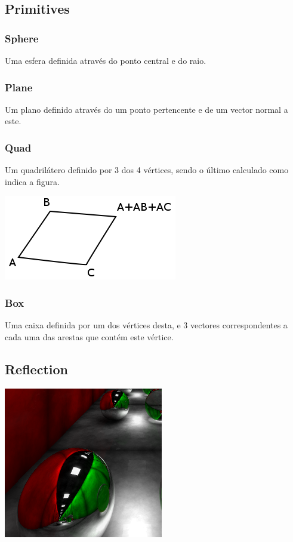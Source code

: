 \documentclass[a4paper]{article}
\begin{document}

\cleardoublepage
\subsection{Primitives}
\indent \indent 

\subsubsection{Sphere}
\indent \indent Uma esfera definida através do ponto central e do raio.   

\subsubsection{Plane}
\indent \indent Um plano definido através do um ponto pertencente e de um vector normal a este.

\subsubsection{Quad}
\indent \indent Um quadrilátero definido por 3 dos 4 vértices, sendo o último calculado como indica a figura.
\begin{center}
	\includegraphics[scale=0.50]{images/quad.png}
	\label{fig:quad}
\end{center}

\subsubsection{Box}
\indent \indent Uma caixa definida por um dos vértices desta, e 3 vectores correspondentes a cada uma das 
arestas que contém este vértice.

\cleardoublepage
\subsection{Reflection}

\begin{center}
	\includegraphics[scale=0.50]{images/reflection.png}
	\label{fig:reflection}
\end{center}
\end{document}
